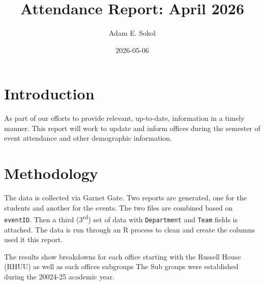 \documentclass[
  letterpaper,
  DIV=11,
  numbers=noendperiod]{scrartcl}
\title{Attendance Report: April 2026}
\author{Adam E. Sokol}
\date{2026-05-06}
\begin{document}
\maketitle




\newpage

\FloatBarrier
\pagestyle{plain}

\section{Introduction}\label{introduction}

\noindent As part of our efforts to provide relevant, up-to-date,
information in a timely manner. This report will work to update and
inform offices during the semester of event attendance and other
demographic information.

\section{Methodology}\label{methodology}

\noindent The data is collected via Garnet Gate. Two reports are
generated, one for the students and another for the events. The two
files are combined based on \texttt{eventID}. Then a third
(3\textsuperscript{rd}) set of data with \texttt{Department} and
\texttt{Team} fields is attached. The data is run through an R process
to clean and create the columns used it this report.

The results show breakdowns for each office starting with the Russell
House (RHUU) as well as each offices subgroups The Sub groups were
established during the 20024-25 academic year.
\end{document}
